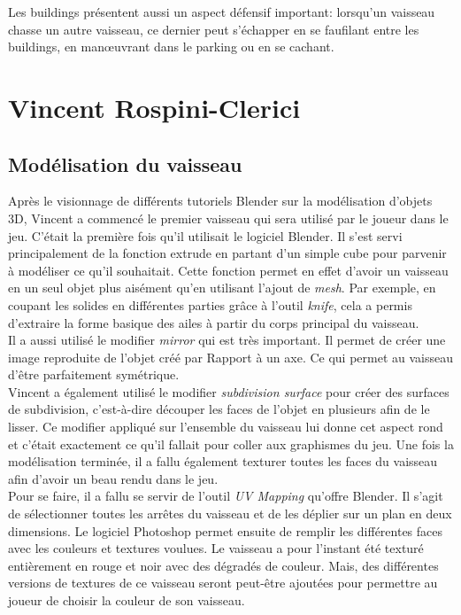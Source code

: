 \documentclass[10pt, titlepage]{report}
\begin{document}
Les buildings présentent aussi un aspect défensif important: lorsqu'un vaisseau chasse un autre vaisseau, ce dernier peut s'échapper en se faufilant entre les buildings, en manœuvrant dans le parking ou en se cachant. 

\section{Vincent Rospini-Clerici}

\subsection{Modélisation du vaisseau}

Après le visionnage de différents tutoriels Blender sur la modélisation d'objets 3D, Vincent a commencé le premier vaisseau qui sera utilisé par le joueur dans le jeu. C'était la première fois qu'il utilisait le logiciel Blender. Il s'est servi principalement de la fonction extrude en partant d'un simple cube pour parvenir à modéliser ce qu'il souhaitait. Cette fonction permet en effet d'avoir un vaisseau en un seul objet plus aisément qu'en utilisant l'ajout de \textit{mesh}. Par exemple, en coupant les solides en différentes parties grâce à l'outil \textit{knife}, cela a permis d'extraire la forme basique des ailes à partir du corps principal du vaisseau.\\

Il a aussi utilisé le modifier \textit{mirror} qui est très important. Il permet de créer une image reproduite de l’objet créé par Rapport à un axe. Ce qui permet au vaisseau d'être parfaitement symétrique.\\

Vincent a également utilisé le modifier \textit{subdivision surface} pour créer des surfaces de subdivision, c’est-à-dire découper les faces de l’objet en plusieurs afin de le lisser. Ce modifier appliqué sur l’ensemble du vaisseau lui donne cet aspect rond et c’était exactement ce qu’il fallait pour coller aux graphismes du jeu.
Une fois la modélisation terminée, il a fallu également texturer toutes les faces du vaisseau afin d'avoir un beau rendu dans le jeu.\\

Pour se faire, il a fallu se servir de l'outil \textit{UV Mapping} qu'offre Blender. Il s'agit de sélectionner toutes les arrêtes du vaisseau et de les déplier sur un plan en deux dimensions. Le logiciel Photoshop permet ensuite de remplir les différentes faces avec les couleurs et textures voulues. Le vaisseau a pour l'instant été texturé entièrement en rouge et noir avec des dégradés de couleur. Mais, des différentes versions de textures de ce vaisseau seront peut-être ajoutées pour permettre au joueur de choisir la couleur de son vaisseau.\\
\end{document}
